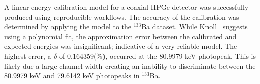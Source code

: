 A linear energy calibration model for a coaxial HPGe detector was successfully produced using reproducible workflows. The accuracy of the calibration was determined by applying the model to the $^{133}$Ba dataset. While Knoll~\cite{knoll2010radiation} suggests using a polynomial fit, the approximation error between the calibrated and expected energies was insignificant; indicative of a very reliable model. The highest error, a $\delta$ of 0.164359(\%), occurred at the 80.9979 keV photopeak. This is likely due a large channel width creating an inability to discriminate between the 80.9979 keV and 79.6142 keV photopeaks in $^{133}$Ba.
